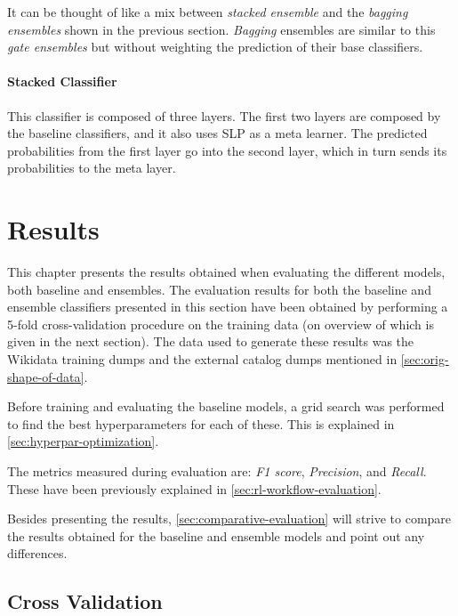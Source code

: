 \documentclass[epsfig,a4paper,11pt,titlepage,twoside,openany]{book}
\begin{document}
It can be thought of like a mix between \textit{stacked ensemble} and the \textit{bagging ensembles} shown in the previous section. \textit{Bagging} ensembles are similar to this \textit{gate ensembles} but without weighting the prediction of their base classifiers. 


\subsubsection{Stacked Classifier}
\label{sec:stack-classifier}

This classifier is composed of three layers. The first two layers are composed by the baseline classifiers, and it also uses SLP as a meta learner. The predicted probabilities from the first layer go into the second layer, which in turn sends its probabilities to the meta layer. 





\chapter{Results}
\label{chap:results}

This chapter presents the results obtained when evaluating the different models, both baseline and ensembles. The evaluation results for both the baseline and ensemble classifiers presented in this section have been obtained by performing a 5-fold cross-validation procedure on the training data (on overview of which is given in the next section). The data used to generate these results was the Wikidata training dumps and the external catalog dumps mentioned in \autoref{sec:orig-shape-of-data}.

Before training and evaluating the baseline models, a grid search was performed to find the best hyperparameters for each of these. This is explained in \autoref{sec:hyperpar-optimization}.

The metrics measured during evaluation are: \textit{F1 score}, \textit{Precision}, and \textit{Recall}. These have been previously explained in \autoref{sec:rl-workflow-evaluation}. 

Besides presenting the results, \autoref{sec:comparative-evaluation} will strive to compare the results obtained for the baseline and ensemble models and point out any differences.


\section{Cross Validation}
\label{sec:cross-validation}
\end{document}
